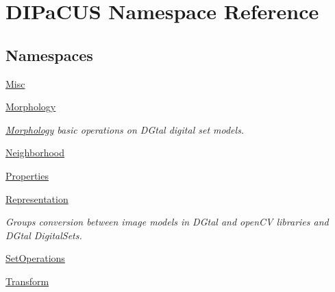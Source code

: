\hypertarget{namespaceDIPaCUS}{}\section{D\+I\+Pa\+C\+US Namespace Reference}
\label{namespaceDIPaCUS}
\subsection*{Namespaces}
\begin{DoxyCompactItemize}
\item 
 \mbox{\hyperlink{namespaceDIPaCUS_1_1Misc}{Misc}}
\item 
 \mbox{\hyperlink{namespaceDIPaCUS_1_1Morphology}{Morphology}}
\begin{DoxyCompactList}\small\item\em \mbox{\hyperlink{namespaceDIPaCUS_1_1Morphology}{Morphology}} basic operations on D\+Gtal digital set models. \end{DoxyCompactList}\item 
 \mbox{\hyperlink{namespaceDIPaCUS_1_1Neighborhood}{Neighborhood}}
\item 
 \mbox{\hyperlink{namespaceDIPaCUS_1_1Properties}{Properties}}
\item 
 \mbox{\hyperlink{namespaceDIPaCUS_1_1Representation}{Representation}}
\begin{DoxyCompactList}\small\item\em Groups conversion between image models in D\+Gtal and open\+CV libraries and D\+Gtal Digital\+Sets. \end{DoxyCompactList}\item 
 \mbox{\hyperlink{namespaceDIPaCUS_1_1SetOperations}{Set\+Operations}}
\item 
 \mbox{\hyperlink{namespaceDIPaCUS_1_1Transform}{Transform}}
\end{DoxyCompactItemize}
